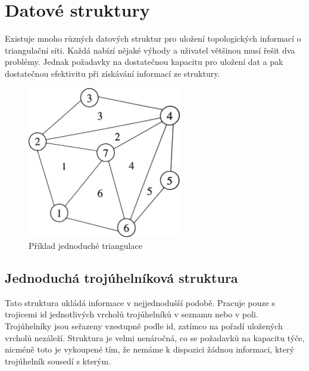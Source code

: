 \documentclass[12pt,a4paper]{article}
\begin{document}
{\newpage
\section{Datové struktury}
\label{sec:data_struct}

Existuje mnoho různých datových struktur pro uložení topologických
informací o triangulační síti. Každá nabízí nějaké výhody a uživatel
většinou musí řešit dva problémy. Jednak požadavky na dostatečnou
kapacitu pro uložení dat a pak dostatečnou efektivitu při získávání
informací ze struktury.

\begin{figure}[h!]
\centering
\includegraphics[width=0.6\textwidth]{img/data_struct.png}
\caption{Příklad jednoduché triangulace}
\label{fig:struct_triangulace}
\end{figure}

\newpage
\subsection{Jednoduchá trojúhelníková struktura}

Tato struktura ukládá informace v nejjednodušší podobě. Pracuje pouze
s trojicemi id jednotlivých vrcholů trojúhelníků v seznamu nebo v
poli. Trojúhelníky jsou seřazeny vzestupně podle id, zatímco na pořadí
uložených vrcholů nezáleží. Struktura je velmi nenáročná, co se
požadavků na kapacitu týče, nicméně toto je vykoupené tím, že nemáme k
dispozici žádnou informaci, který trojúhelník sousedí s kterým.

}
\end{document}
